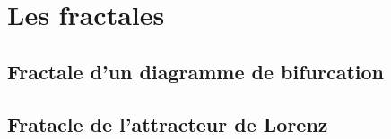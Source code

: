 \chapter{Les fractales}

\section{Fractale d'un diagramme de bifurcation}

\section{Fratacle de l'attracteur de Lorenz}